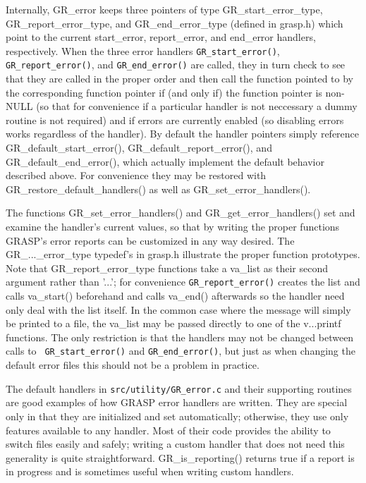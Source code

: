 Internally, GR\_error keeps three pointers of type
GR\_start\_error\_type, GR\_report\_error\_type, and
GR\_end\_error\_type (defined in grasp.h) which point to the current
start\_error, report\_error, and end\_error handlers, respectively.
When the three error handlers {\tt GR\_start\_error()}, {\tt
GR\_report\_error()}, and {\tt GR\_end\_error()} are called, they in
turn check to see that they are called in the proper order and then
call the function pointed to by the corresponding function pointer if
(and only if) the function pointer is non-NULL (so that for convenience
if a particular handler is not neccessary a dummy routine is not
required) and if errors are currently enabled (so disabling errors
works regardless of the handler).  By default the handler pointers
simply reference GR\_default\_start\_error(),
GR\_default\_report\_error(), and GR\_default\_end\_error(), which
actually implement the default behavior described above.  For
convenience they may be restored with GR\_restore\_default\_handlers()
as well as GR\_set\_error\_handlers().

The functions GR\_set\_error\_handlers() and GR\_get\_error\_handlers()
set and examine the handler's current values, so that by writing the
proper functions GRASP's error reports can be customized in any way
desired.  The GR\_...\_error\_type typedef's in grasp.h illustrate the
proper function prototypes.  Note that GR\_report\_error\_type
functions take a va\_list as their second argument rather than '...';
for convenience {\tt GR\_report\_error()} creates the list and calls
va\_start() beforehand and calls va\_end() afterwards so the handler
need only deal with the list itself.  In the common case where the
message will simply be printed to a file, the va\_list may be passed
directly to one of the v...printf functions.  The only restriction is
that the handlers may not be changed between calls to {\tt
GR\_start\_error()} and {\tt GR\_end\_error()}, but just as when
changing the default error files this should not be a problem in
practice.

The default handlers in {\tt src/utility/GR\_error.c} and their
supporting routines are good examples of how GRASP error handlers are
written.  They are special only in that they are initialized and set
automatically; otherwise, they use only features available to any
handler.  Most of their code provides the ability to switch files
easily and safely; writing a custom handler that does not need this
generality is quite straightforward.  GR\_is\_reporting() returns true
if a report is in progress and is sometimes useful when writing custom
handlers.

